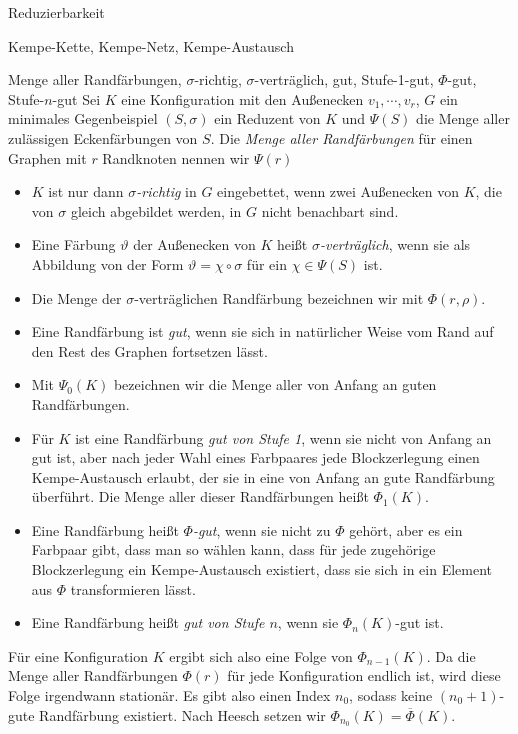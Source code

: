 \begin{section}{Reduzierbarkeit}
\begin{definition}{Kempe-Kette, Kempe-Netz, Kempe-Austausch}
 \end{definition}

 
 \begin{definition}{Menge aller Randfärbungen, $\sigma$-richtig, $\sigma$-verträglich, gut, Stufe-1-gut, $\Phi$-gut, Stufe-$n$-gut}
  Sei $K$ eine Konfiguration mit den Außenecken $v_1,\cdots,v_r$, $G$ ein minimales Gegenbeispiel $(S,\sigma)$ ein Reduzent von $K$ und $\Psi(S)$ die Menge aller zulässigen Eckenfärbungen von $S$. Die \textit{Menge aller Randfärbungen} für einen Graphen mit $r$ Randknoten nennen wir $\Psi(r)$
  \begin{itemize}
   \item $K$ ist nur dann \textit{$\sigma$-richtig} in $G$ eingebettet, wenn zwei Außenecken von $K$, die von $\sigma$ gleich abgebildet werden, in $G$ nicht benachbart sind. 
   \item Eine Färbung $\vartheta$ der Außenecken von $K$ heißt \textit{$\sigma$-verträglich}, wenn sie als Abbildung von der Form $\vartheta = \chi \circ \sigma$ für ein $\chi \in \Psi(S)$ ist.
   \item Die Menge der $\sigma$-verträglichen Randfärbung bezeichnen wir mit $\Phi(r,\rho)$.
   \item Eine Randfärbung ist \textit{gut}, wenn sie sich in natürlicher Weise vom Rand auf den Rest des Graphen fortsetzen lässt.
   \item Mit $\Psi_0(K)$ bezeichnen wir die Menge aller von Anfang an guten Randfärbungen.
   \item Für $K$ ist eine Randfärbung \textit{gut von Stufe 1}, wenn sie nicht von Anfang an gut ist, aber nach jeder Wahl eines Farbpaares jede Blockzerlegung einen Kempe-Austausch erlaubt, der sie in eine von Anfang an gute Randfärbung überführt. Die Menge aller dieser Randfärbungen heißt $\Phi_1(K)$.
   \item Eine Randfärbung heißt \textit{$\Phi$-gut}, wenn sie nicht zu $\Phi$ gehört, aber es ein Farbpaar gibt, dass man so wählen kann, dass für jede zugehörige Blockzerlegung ein Kempe-Austausch existiert, dass sie sich in ein Element aus $\Phi$ transformieren lässt.
   \item Eine Randfärbung heißt \textit{gut von Stufe $n$}, wenn sie $\Phi_n(K)$-gut ist.
  \end{itemize}
  Für eine Konfiguration $K$ ergibt sich also eine Folge von $\Phi_{n-1}(K)$. Da die Menge aller Randfärbungen $\Phi(r)$ für jede Konfiguration endlich ist, wird diese Folge irgendwann stationär. Es gibt also einen Index $n_0$, sodass keine $(n_0+1)$-gute Randfärbung existiert. Nach Heesch setzen wir $\Phi_{n_0}(K) = \overline{\Phi}(K)$.
 \end{definition}


\end{section}
